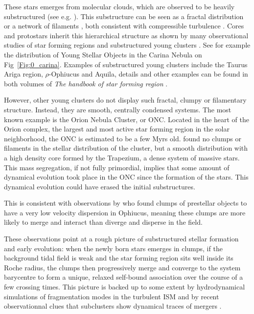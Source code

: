These stars emerges from molecular clouds, which are observed to be heavily substructured (see e.g. \citealt{Cambresy1999}). This substructure can be seen as a fractal distribution \citep{Elmegreen1996} or a network of filaments \citep{Andre2010}, both consistent with compressible turbulence \citep{McKee2007}. Cores and protostars inherit this hierarchical structure as shown by many observational studies of star forming regions and substructured young clusters \citep{Schneider1979,Hartmann2002,Bressert2010}. See for example the distribution of Young Stellar Objects in the Carina Nebula on Fig~\ref{Fig:0_carina}. Examples of substructured young clusters include the Taurus Ariga region, $\rho$-Ophiucus and Aquila, details and other examples can be found in both volumes of \textit{The handbook of star forming region} \cite{Reipurth2008}.  

However, other young clusters do not display such fractal, clumpy or filamentary structure. Instead, they are smooth, centrally condensed systems. The most known example is the Orion Nebula Cluster, or ONC. Located in the heart of the Orion complex, the largest and most active star forming region in the solar neighborhood, the ONC is estimated to be a few Myrs old. \cite{Hillenbrand1998} found no clumps or filaments in the stellar distribution of the cluster, but a smooth distribution with a high density core formed by the Trapezium, a dense system of massive stars. This mass segregation, if not fully primordial, implies that some amount of dynamical evolution took place in the ONC since the formation of the stars. This dynamical evolution could have erased the initial substructures.

This is consistent with observations by \cite{Andre2007} who found clumps of prestellar objects to have a very low velocity dispersion in Ophiucus, meaning these clumps are more likely to merge and interact than diverge and disperse in the field.

These observations point at a rough picture of substructured stellar formation and early evolution: when the newly born stars emerges in clumps, if the background tidal field is weak and the star forming region sits well inside its Roche radius, the clumps then progressively merge and converge to the system barycentre to form a unique, relaxed  self-bound association over the course of a few crossing times. This picture is backed up to some extent by hydrodynamical simulations of fragmentation modes in the turbulent ISM \citep{Klessen2000,Bate2003,MacLow2004,Offner2009,Maschberger2010} and by recent observationnal clues that subclusters show dynamical traces of mergers \citep{Kuhn2015b}. 


